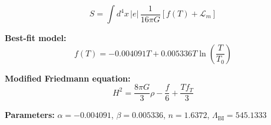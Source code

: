 
\begin{equation}
  S = \int d^4x \, |e| \, \frac{1}{16\pi G} \left[ f(T) + \mathcal{L}_m \right]
\end{equation}

\textbf{Best-fit model:}
\begin{equation}
  f(T) = -0.004091 T + 0.005336 T \ln\!\left(\frac{T}{T_0}\right)
\end{equation}

\textbf{Modified Friedmann equation:}
\begin{equation}
  H^2 = \frac{8\pi G}{3} \rho - \frac{f}{6} + \frac{T f_T}{3}
\end{equation}

\textbf{Parameters:}
$\alpha = -0.004091$, \quad
$\beta = 0.005336$, \quad
$n = 1.6372$, \quad
$\Lambda_{\text{BI}} = 545.1333$